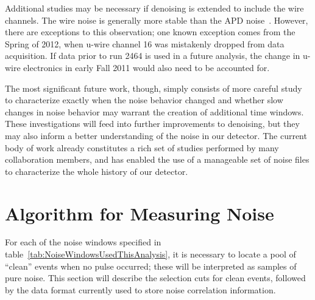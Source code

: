 Additional studies may be necessary if denoising is extended to include the wire channels.  The wire noise is generally more stable than the APD noise~\cite{JosiahCoherentAPDNoise}.  However, there are exceptions to this observation; one known exception comes from the Spring of 2012, when u-wire channel 16 was mistakenly dropped from data acquisition.  If data prior to run 2464 is used in a future analysis, the change in u-wire electronics in early Fall 2011 would also need to be accounted for.

The most significant future work, though, simply consists of more careful study to characterize exactly when the noise behavior changed and whether slow changes in noise behavior may warrant the creation of additional time windows.  These investigations will feed into further improvements to denoising, but they may also inform a better understanding of the noise in our detector.  The current body of work already constitutes a rich set of studies performed by many collaboration members, and has enabled the use of a manageable set of noise files to characterize the whole history of our detector.

\section{Algorithm for Measuring Noise}\label{sec:NoiseCorrelationsImplementation}

For each of the noise windows specified in table~\ref{tab:NoiseWindowsUsedThisAnalysis}, it is necessary to locate a pool of ``clean'' events when no pulse occurred; these will be interpreted as samples of pure noise.  This section will describe the selection cuts for clean events, followed by the data format currently used to store noise correlation information.

